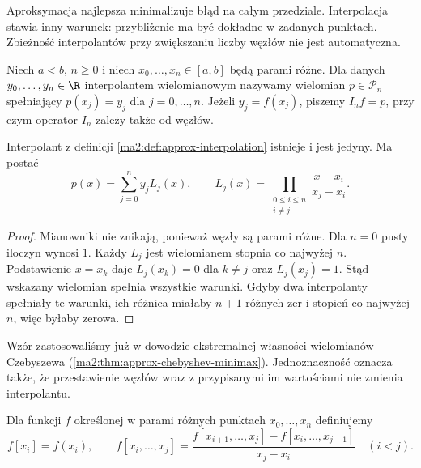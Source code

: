 Aproksymacja najlepsza minimalizuje błąd na całym
przedziale. Interpolacja stawia inny warunek:
przybliżenie ma być dokładne w zadanych punktach.
Zbieżność interpolantów przy zwiększaniu liczby
węzłów nie jest automatyczna.

\begin{definicja}
\label{ma2:def:approx-interpolation}
Niech $a<b$, $n\ge0$ i niech
$x_0,\ldots,x_n\in[a,b]$ będą parami różne.
Dla danych $y_0,\ldots,y_n\in\R$ interpolantem
wielomianowym nazywamy wielomian $p\in\mathcal P_n$
spełniający $p(x_j)=y_j$ dla $j=0,\ldots,n$.
Jeżeli $y_j=f(x_j)$, piszemy $I_nf=p$,
przy czym operator $I_n$ zależy także od węzłów.
\end{definicja}

\begin{twierdzenie}
\label{ma2:thm:approx-lagrange}
Interpolant z definicji \ref{ma2:def:approx-interpolation}
istnieje i jest jedyny. Ma postać
\[
 p(x)=\sum_{j=0}^n y_j L_j(x),\qquad
 L_j(x)=\prod_{\substack{0\le i\le n\\i\ne j}}
 \frac{x-x_i}{x_j-x_i}.
\]
\end{twierdzenie}
\begin{proof}
Mianowniki nie znikają, ponieważ węzły są
parami różne. Dla $n=0$ pusty iloczyn wynosi $1$.
Każdy $L_j$ jest wielomianem stopnia co najwyżej $n$.
Podstawienie $x=x_k$ daje $L_j(x_k)=0$ dla
$k\ne j$ oraz $L_j(x_j)=1$.
Stąd wskazany wielomian spełnia wszystkie warunki.
Gdyby dwa interpolanty spełniały te warunki,
ich różnica miałaby $n+1$ różnych zer i stopień
co najwyżej $n$, więc byłaby zerowa.
\end{proof}

Wzór zastosowaliśmy już w dowodzie ekstremalnej
własności wielomianów Czebyszewa
(\ref{ma2:thm:approx-chebyshev-minimax}).
Jednoznaczność oznacza także, że przestawienie
węzłów wraz z przypisanymi im wartościami
nie zmienia interpolantu.

\begin{definicja}
\label{ma2:def:approx-divided-differences}
Dla funkcji $f$ określonej w parami różnych
punktach $x_0,\ldots,x_n$ definiujemy
\[
 f[x_i]=f(x_i),\qquad
 f[x_i,\ldots,x_j]=
 \frac{f[x_{i+1},\ldots,x_j]-f[x_i,\ldots,x_{j-1}]}
 {x_j-x_i}\quad(i<j).
\]
\end{definicja}

